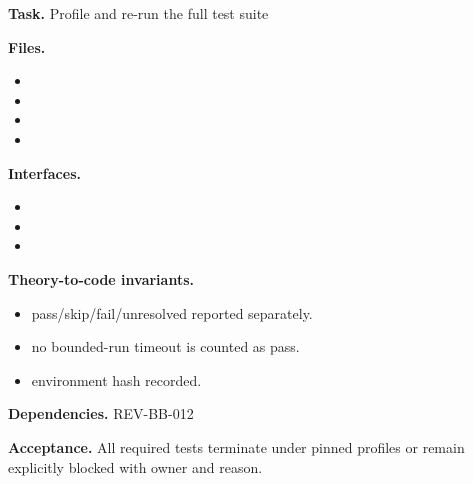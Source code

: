 \begin{statusbox}[CODE-BB-012]
\textbf{Task.} Profile and re-run the full test suite\par
\textbf{Files.}
\begin{itemize}[leftmargin=1.7em,itemsep=1.5pt,topsep=2pt]
\item {}
\item {}
\item {}
\item {}
\end{itemize}
\textbf{Interfaces.}
\begin{itemize}[leftmargin=1.7em,itemsep=1.5pt,topsep=2pt]
\item {}
\item {}
\item {}
\end{itemize}
\textbf{Theory-to-code invariants.}
\begin{itemize}[leftmargin=1.7em,itemsep=1.5pt,topsep=2pt]
\item pass/skip/fail/unresolved reported separately.
\item no bounded-run timeout is counted as pass.
\item environment hash recorded.
\end{itemize}
\textbf{Dependencies.} REV-BB-012\par
\textbf{Acceptance.} All required tests terminate under pinned profiles or remain explicitly blocked with owner and reason.
\end{statusbox}

